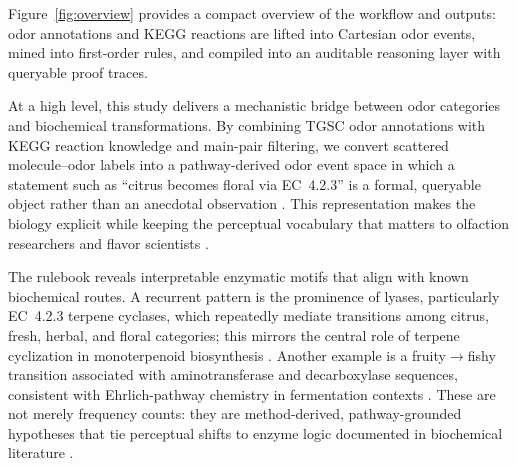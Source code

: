 \documentclass[a4paper,fleqn]{cas-sc}
\begin{document}
Figure~\ref{fig:overview} provides a compact overview of the workflow and outputs: odor annotations and KEGG reactions are lifted into Cartesian odor events, mined into first-order rules, and compiled into an auditable reasoning layer with queryable proof traces.



At a high level, this study delivers a mechanistic bridge between odor categories and biochemical transformations. By combining TGSC odor annotations with KEGG reaction knowledge and main-pair filtering, we convert scattered molecule--odor labels into a pathway-derived odor event space in which a statement such as ``citrus becomes floral via EC~4.2.3'' is a formal, queryable object rather than an anecdotal observation \citep{Sharma2024,Kanehisa2021,Tholl2015}. This representation makes the biology explicit while keeping the perceptual vocabulary that matters to olfaction researchers and flavor scientists \citep{Schwab2008,Dunkel2014}.

The rulebook reveals interpretable enzymatic motifs that align with known biochemical routes. A recurrent pattern is the prominence of lyases, particularly EC~4.2.3 terpene cyclases, which repeatedly mediate transitions among citrus, fresh, herbal, and floral categories; this mirrors the central role of terpene cyclization in monoterpenoid biosynthesis \citep{Tholl2015,Kanehisa2021}. Another example is a fruity$\rightarrow$fishy transition associated with aminotransferase and decarboxylase sequences, consistent with Ehrlich-pathway chemistry in fermentation contexts \citep{Hazelwood2008}. These are not merely frequency counts: they are method-derived, pathway-grounded hypotheses that tie perceptual shifts to enzyme logic documented in biochemical literature \citep{Schwab2008,Dunkel2014}.
\end{document}
